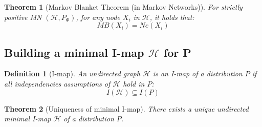 \documentclass[11pt]{article}
\numberwithin{equation}{section}
\theoremstyle{boldStyle}
\theoremstyle{boldBlueStyle}
\theoremstyle{boldPurpleStyle}
\newtheorem{theorem}{Theorem}[section]
\theoremstyle{boldRedStyle}
\newtheorem{definition}{Definition}[section]
\begin{document}
\begin{theorem}[Markov Blanket Theorem (in Markov Networks)]
    For strictly positive MN $(\mathcal{H}, P_{\Phi})$, for any node $X_i$ in $\mathcal{H}$, it holds that:
    \begin{equation*}
        MB(X_i) = Ne(X_i)
    \end{equation*}
\end{theorem}


\subsection{Building a minimal I-map $\mathcal{H}$ for P}

\begin{definition}[I-map]
    An undirected graph $\mathcal{H}$ is an I-map of a distribution $P$ if all independencies assumptions of $\mathcal{H}$ hold in $P$:
    \begin{equation*}
        I(\mathcal{H}) \subseteq I(P)
    \end{equation*}
\end{definition}


\begin{algorithm}[H]
    \SetNoFillComment
    \SetAlgoLined
    \caption{Building a minimal I-map $\mathcal{H}$ for P} \label{algo:build_minimal_imap}
\end{algorithm}


\begin{theorem}[Uniqueness of minimal I-map]
    There exists a unique undirected minimal I-map $\mathcal{H}$ of a distribution $P$.
\end{theorem}
\end{document}
